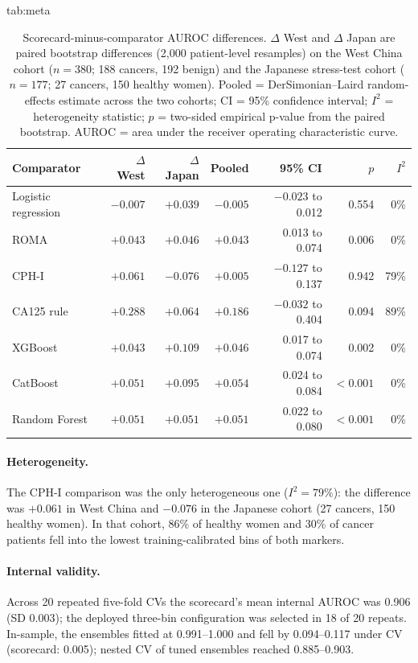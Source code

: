 \documentclass[pmlr,twocolumn,10pt]{jmlr} %
\begin{document}
\begin{table}[htbp]
\floatconts
  {tab:meta}
  {\caption{Scorecard-minus-comparator AUROC differences. $\Delta$ West
   and $\Delta$ Japan are paired bootstrap differences (2{,}000
   patient-level resamples) on the West China cohort ($n=380$; 188
   cancers, 192 benign) and the Japanese stress-test cohort ($n=177$; 27
   cancers, 150 healthy women). Pooled = DerSimonian--Laird random-effects
   estimate across the two cohorts; CI = 95\% confidence interval;
   $I^2$ = heterogeneity statistic; $p$ = two-sided empirical p-value from
   the paired bootstrap. AUROC = area under the receiver operating
   characteristic curve.}}
  {\small\begin{tabular}{lrrrrrr}
  \toprule
  Comparator & $\Delta$ West & $\Delta$ Japan & Pooled & 95\% CI & $p$ & $I^2$\\
  \midrule
  Logistic regression & $-0.007$ & $+0.039$ & $-0.005$ & $-0.023$ to 0.012 & 0.554 & 0\%\\
  ROMA & $+0.043$ & $+0.046$ & $+0.043$ & 0.013 to 0.074 & 0.006 & 0\%\\
  CPH-I & $+0.061$ & $-0.076$ & $+0.005$ & $-0.127$ to 0.137 & 0.942 & 79\%\\
  CA125 rule & $+0.288$ & $+0.064$ & $+0.186$ & $-0.032$ to 0.404 & 0.094 & 89\%\\
  XGBoost & $+0.043$ & $+0.109$ & $+0.046$ & 0.017 to 0.074 & 0.002 & 0\%\\
  CatBoost & $+0.051$ & $+0.095$ & $+0.054$ & 0.024 to 0.084 & $<0.001$ & 0\%\\
  Random Forest & $+0.051$ & $+0.051$ & $+0.051$ & 0.022 to 0.080 & $<0.001$ & 0\%\\
  \bottomrule
  \end{tabular}}
\end{table}

\paragraph{Heterogeneity.} The CPH-I comparison was the only heterogeneous
one ($I^2=79\%$): the difference was $+0.061$ in West China and $-0.076$ in
the Japanese cohort (27 cancers, 150 healthy women). In that cohort, 86\% of healthy women and 30\% of
cancer patients fell into the lowest training-calibrated bins of both
markers.

\paragraph{Internal validity.} Across 20 repeated five-fold CVs the
scorecard's mean internal AUROC was 0.906 (SD 0.003); the deployed
three-bin configuration was selected in 18 of 20 repeats. In-sample,
the ensembles fitted at 0.991--1.000 and fell by 0.094--0.117 under CV
(scorecard: 0.005); nested CV of tuned ensembles reached 0.885--0.903.
\end{document}
